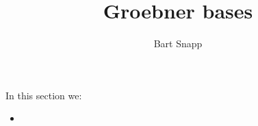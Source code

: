 \documentclass{ximera}
\author{Bart Snapp}
\title{Groebner bases}
\begin{document}
\begin{abstract}
\end{abstract}
\maketitle
In this section we:

\begin{itemize}
\item 
\end{itemize}
\end{document}
